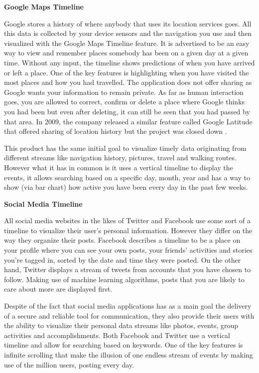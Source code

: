 \documentclass{l4proj}
\begin{document}
\textbf{Google Maps Timeline \cite{GoogleMapsTimeline}}

Google stores a history of where anybody that uses its location services goes. All this data is collected by your device sensors and the navigation you use and then visualized with the Google Maps Timeline feature. It is advertised to be an easy way to view and remember places somebody has been on a given day at a given time. Without any input, the timeline shows predictions of when you have arrived or left a place. One of the key features is highlighting when you have visited the most places and how you had travelled. The application does not offer sharing as Google wants your information to remain private. As far as human interaction goes, you are allowed to correct, confirm or delete a place where Google thinks you had been but even after deleting,  it can still be seen that you had passed by that area. In 2009, the company released a similar feature called Google Latitude that offered sharing of location history but the project was closed down \cite{GMTimeFeature}.


This product has the same initial goal to visualize timely data originating from different streams like navigation history, pictures, travel and walking routes. However what it has in common is it uses a vertical timeline to display the events, it allows searching based on a specific day, month, year and has a way to show (via bar chart) how active you have been every day in the past few weeks. 

\textbf{Social Media Timeline}

All social media websites in the likes of Twitter and Facebook use some sort of a timeline to visualize their user's personal information. However they differ on the way they organize their posts. Facebook describes a timeline to be a place on your profile where you can see your own posts, your friends' activities and stories you're tagged in, sorted by the date and time they were posted. On the other hand, Twitter displays a stream of tweets from accounts that you have chosen to follow. Making use of machine learning algorithms, posts that you are likely to care about more are displayed first.


Despite of the fact that social media applications has as a main goal the delivery of a secure and reliable tool for communication, they also provide their users with the ability to visualize their personal data streams like photos, events, group activities and accomplishments. Both Facebook and Twitter use a vertical timeline and allow for searching based on keywords. One of the key features is infinite scrolling that make the illusion of one endless stream of events by making use of the million users, posting every day. 
\end{document}
